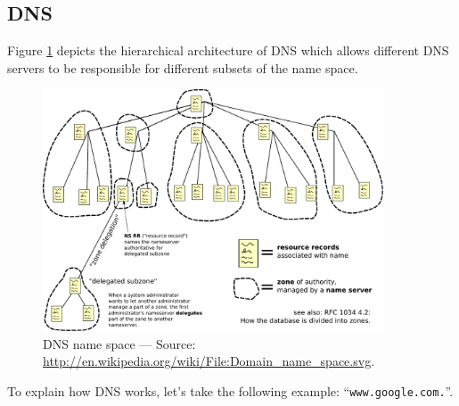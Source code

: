 \documentclass[pdftex,12pt,a4paper]{article}
\begin{document}
        \subsection{DNS}
            Figure \ref{fig:dnsnamespace} depicts the hierarchical architecture
            of DNS which allows different DNS servers to be responsible for
            different subsets of the name space. 

            \begin{figure}[tbh]
                \centering
                \includegraphics[width=0.9\textwidth]{figures/Domain_name_space}
                \caption{DNS name space --- Source:
                \url{http://en.wikipedia.org/wiki/File:Domain_name_space.svg}.}
                \label{fig:dnsnamespace}
            \end{figure}

            To explain how DNS works, let's take the following example:
            ``\texttt{www.google.com.}''.
\end{document}
